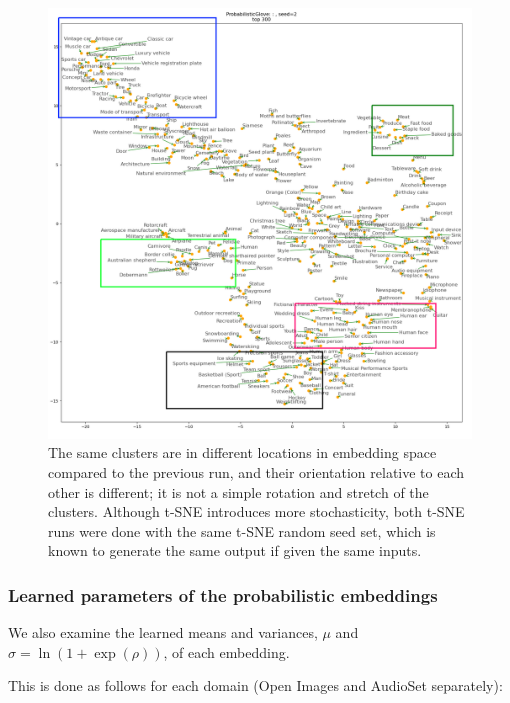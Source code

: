 \begin{figure}[H]
    \centering
    \label{fig:openimages2}
    \includegraphics[width=\textwidth]{images/method/probabilistic_independent/top300_tsne_openimages__ProbabilisticGlove_2_clusters.png}
    \caption{
        The same clusters are in different locations in embedding space compared to the previous run, and their orientation relative to each other is different; it is not a simple rotation and stretch of the clusters. Although t-SNE introduces more stochasticity, both t-SNE runs were done with the same t-SNE random seed set, which is known to generate the same output if given the same inputs. 
    }
\end{figure}

\newpage
\subsubsection{Learned parameters of the probabilistic embeddings}

We also examine the learned means and variances, $\mu$ and $\sigma = \ln(1 + \exp(\rho))$, of each embedding. 

This is done as follows for each domain (Open Images and AudioSet separately):

